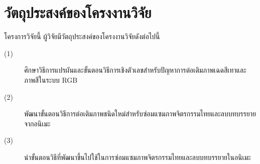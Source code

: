 \clearpage
\section{วัตถุประสงค์ของโครงงานวิจัย}
\hspace{1cm} โครงการวิจัยนี้ ผู้วิจัยมีวัตถุประสงค์ของโครงงานวิจัยดังต่อไปนี้

\begin{description}
	\item[(1)] ศึกษาวิธีการแปรผันและขั้นตอนวิธีการเชิงตัวเลขสำหรับปัญหาการต่อเติมภาพเฉดสีเทาและภาพสีในระบบ RGB
	\item[(2)] พัฒนาขั้นตอนวิธีการต่อเติมภาพชนิดใหม่สำหรับซ่อมแซมภาพจิตรกรรมไทยและลบบทบรรยายจากอนิเมะ
	\item[(3)] นำขั้นตอนวิธีที่พัฒนาขึ้นไปใช้ในการซ่อมแซมภาพจิตรกรรมไทยและลบบทบรรยายในอนิเมะ
\end{description}

